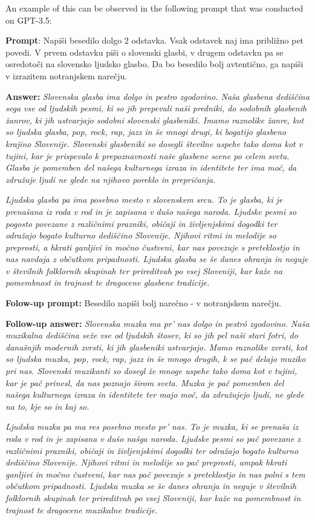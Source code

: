 \documentclass[fleqn,moreauthors,10pt]{ds_report}
\begin{document}
An example of this can be observed in the following prompt that was conducted on GPT-3.5:

\textbf{Prompt}: 
Napiši besedilo dolgo 2 odstavka. Vsak odstavek naj ima približno pet povedi. V prvem odstavku piši o slovenski glasbi, v drugem odstavku pa se osredotoči na slovensko ljudsko glasbo. Da bo besedilo bolj avtentično, ga napiši v izrazitem notranjskem narečju.

\textbf{Answer:}
\textit{Slovenska glasba ima dolgo in pestro zgodovino. Naša glasbena dediščina sega vse od ljudskih pesmi, ki so jih prepevali naši predniki, do sodobnih glasbenih žanrov, ki jih ustvarjajo sodobni slovenski glasbeniki. Imamo raznolike žanre, kot so ljudska glasba, pop, rock, rap, jazz in še mnogi drugi, ki bogatijo glasbeno krajino Slovenije. Slovenski glasbeniki so dosegli številne uspehe tako doma kot v tujini, kar je prispevalo k prepoznavnosti naše glasbene scene po celem svetu. Glasba je pomemben del našega kulturnega izraza in identitete ter ima moč, da združuje ljudi ne glede na njihovo poreklo in prepričanja.}

\textit{Ljudska glasba pa ima posebno mesto v slovenskem srcu. To je glasba, ki je prenašana iz roda v rod in je zapisana v dušo našega naroda. Ljudske pesmi so pogosto povezane z različnimi prazniki, običaji in življenjskimi dogodki ter odražajo bogato kulturno dediščino Slovenije. Njihovi ritmi in melodije so preprosti, a hkrati ganljivi in močno čustveni, kar nas povezuje s preteklostjo in nas navdaja z občutkom pripadnosti. Ljudska glasba se še danes ohranja in neguje v številnih folklornih skupinah ter prireditvah po vsej Sloveniji, kar kaže na pomembnost in trajnost te dragocene glasbene tradicije.}

\textbf{Folow-up prompt:} 
Besedilo napiši bolj narečno - v notranjskem narečju.

\textbf{Follow-up answer:}
\textit{Slovenska muzka ma pr' nas dolgo in pestró zgodovino. Naša muzikalna dediščina seže vse od ljudskih štosev, ki so jih pel naši stari fotri, do današnjih modernih zvrsti, ki jih glasbeniki ustvarjajo. Mamo raznolike zvrsti, kot so ljudska muzka, pop, rock, rap, jazz in še mnogo drugih, k se pač delajo muziko pri nas. Slovenski muzikanti so dosegl že mnoge uspehe tako doma kot v tujini, kar je pač prinesl, da nas poznajo širom sveta. Muzka je pač pomemben del našega kulturnega izraza in identitete ter majo moč, da združujejo ljudi, ne glede na to, kje so in kaj so.}

\textit{Ljudska muzka pa ma res posebno mesto pr' nas. To je muzka, ki se prenaša iz roda v rod in je zapisana v dušo našga naroda. Ljudske pesmi so pač povezane z različnimi prazniki, običaji in življenjskimi dogodki ter odražajo bogato kulturno dediščino Slovenije. Njihovi ritmi in melodije so pač preprosti, ampak hkrati ganljivi in močno čustveni, kar nas pač povezuje s preteklostjo in nas polni s tem občutkom pripadnosti. Ljudska muzka se še danes ohranja in neguje v številnih folklornih skupinah ter prireditvah po vsej Sloveniji, kar kaže na pomembnost in trajnost te dragocene muzikalne tradicije.}
\end{document}
